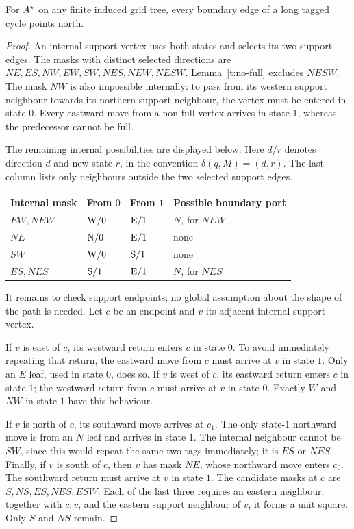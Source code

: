 \begin{lemma}\label{t:north-boundary}
For \(A^{\star}\) on any finite induced grid tree, every boundary edge of a
long tagged cycle points north.
\end{lemma}
\begin{proof}
An internal support vertex uses both states and selects its two support
edges. The masks with distinct selected directions are
\(NE,ES,NW,EW,SW,NES,NEW,NESW\).
Lemma~\ref{t:no-full} excludes \(NESW\). The mask \(NW\) is also impossible
internally: to pass from its western support neighbour towards its
northern support neighbour, the vertex must be entered in state \(0\).
Every eastward move from a non-full vertex arrives in state \(1\), whereas
the predecessor cannot be full.

The remaining internal possibilities are displayed below. Here \(d/r\)
denotes direction \(d\) and new state \(r\), in the convention
\(\delta(q,M)=(d,r)\). The last column lists only neighbours outside the
two selected support edges.
\begin{center}
\small
\begin{tabular}{@{}llll@{}}
\toprule
Internal mask & From \(0\) & From \(1\) & Possible boundary port\\
\midrule
\(EW,NEW\) & \(\mathrm{W}/0\) & \(\mathrm{E}/1\) & \(N\), for \(NEW\)\\
\(NE\) & \(\mathrm{N}/0\) & \(\mathrm{E}/1\) & none\\
\(SW\) & \(\mathrm{W}/0\) & \(\mathrm{S}/1\) & none\\
\(ES,NES\) & \(\mathrm{S}/1\) & \(\mathrm{E}/1\) & \(N\), for \(NES\)\\
\bottomrule
\end{tabular}
\end{center}
It remains to check support endpoints; no global assumption about the
shape of the path is needed. Let \(c\) be an endpoint and \(v\) its adjacent
internal support vertex.

If \(v\) is east of \(c\), its westward return enters \(c\) in state \(0\).
To avoid immediately repeating that return, the eastward move from \(c\)
must arrive at \(v\) in state \(1\). Only an \(E\) leaf, used in state \(0\),
does so.
If \(v\) is west of \(c\), its eastward return enters \(c\) in state \(1\);
the westward return from \(c\) must arrive at \(v\) in state \(0\).
Exactly \(W\) and \(NW\) in state \(1\) have this behaviour.

If \(v\) is north of \(c\), its southward move arrives at \(c_1\).
The only state-\(1\) northward move is from an \(N\) leaf and arrives in
state \(1\). The internal neighbour cannot be \(SW\), since this would
repeat the same two tags immediately; it is \(ES\) or \(NES\).
Finally, if \(v\) is south of \(c\), then \(v\) has mask \(NE\), whose
northward move enters \(c_0\). The southward return must arrive at \(v\)
in state \(1\).
The candidate masks at \(c\) are \(S,NS,ES,NES,ESW\). Each of the last
three requires an eastern neighbour; together with \(c,v\), and the
eastern support neighbour of \(v\), it forms a unit square. Only
\(S\) and \(NS\) remain.


\end{proof}
